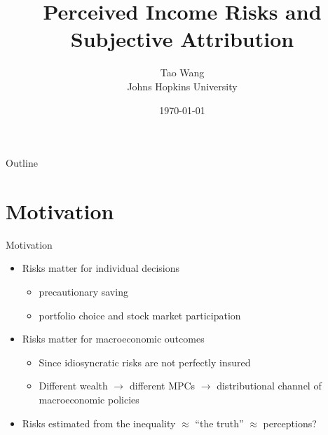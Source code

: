 \documentclass{beamer}
\title{Perceived Income Risks and Subjective Attribution}
\author{Tao Wang \\ Johns Hopkins University}
\date{\today}
\begin{document}
	

\begin{frame}
	\titlepage
\end{frame}
\begin{frame}{Outline}
	\tableofcontents
\end{frame}


\section{Motivation}

\begin{frame}{Motivation}
	\begin{itemize}
		\item Risks matter for individual decisions
		\begin{itemize}
			\item precautionary saving
			\item portfolio choice and stock market participation
		\end{itemize} 
		\item Risks matter for macroeconomic outcomes
		\begin{itemize}
			\item Since idiosyncratic risks are not perfectly insured 
			\item Different wealth $\rightarrow$ different MPCs $\rightarrow$ distributional channel of macroeconomic policies 
		\end{itemize}  %
		\item Risks estimated from the inequality $\approx$  ``the truth''  $\approx$ perceptions? %
	\end{itemize}
\end{frame}
\end{document}
